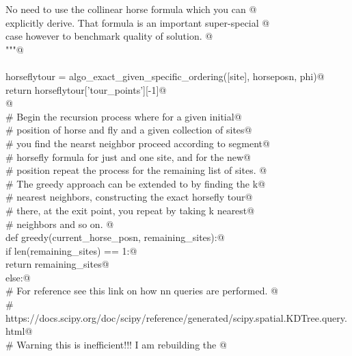 \documentclass[11.5pt]{report}
\begin{document}
\begin{flushleft}
\begin{list}{}{}
\mbox{}\verb@            No need to use the collinear horse formula which you can @\\
\mbox{}\verb@            explicitly derive. That formula is  an important super-special @\\
\mbox{}\verb@            case however to benchmark quality of solution. @\\
\mbox{}\verb@            """@\\
\mbox{}\verb@@\\
\mbox{}\verb@            horseflytour = algo_exact_given_specific_ordering([site], horseposn, phi)@\\
\mbox{}\verb@            return horseflytour['tour_points'][-1]@\\
\mbox{}\verb@      @\\
\mbox{}\verb@      # Begin the recursion process where for a given initial@\\
\mbox{}\verb@      # position of horse and fly and a given collection of sites@\\
\mbox{}\verb@      # you find the nearst neighbor proceed according to segment@\\
\mbox{}\verb@      # horsefly formula for just and one site, and for the new@\\
\mbox{}\verb@      # position repeat the process for the remaining list of sites. @\\
\mbox{}\verb@      # The greedy approach can be extended to by finding the k@\\
\mbox{}\verb@      # nearest neighbors, constructing the exact horsefly tour@\\
\mbox{}\verb@      # there, at the exit point, you repeat by taking k nearest@\\
\mbox{}\verb@      # neighbors and so on. @\\
\mbox{}\verb@      def greedy(current_horse_posn, remaining_sites):@\\
\mbox{}\verb@            if len(remaining_sites) == 1:@\\
\mbox{}\verb@                  return remaining_sites@\\
\mbox{}\verb@            else:@\\
\mbox{}\verb@                  # For reference see this link on how nn queries are performed. @\\
\mbox{}\verb@                  # https://docs.scipy.org/doc/scipy/reference/generated/scipy.spatial.KDTree.query.html@\\
\mbox{}\verb@                  # Warning this is inefficient!!! I am rebuilding the @\\

\end{list}
\end{flushleft}
\end{document}
